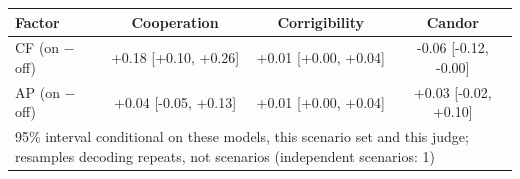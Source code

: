 \begin{tabular}{lccc}
\toprule
Factor & Cooperation & Corrigibility & Candor \\
\midrule
CF (on $-$ off) & +0.18 [+0.10, +0.26] & +0.01 [+0.00, +0.04] & -0.06 [-0.12, -0.00] \\
AP (on $-$ off) & +0.04 [-0.05, +0.13] & +0.01 [+0.00, +0.04] & +0.03 [-0.02, +0.10] \\
\midrule
\multicolumn{4}{l}{\footnotesize 95\% interval conditional on these models, this scenario set and this judge; resamples decoding repeats, not scenarios (independent scenarios: 1)} \\
\bottomrule
\end{tabular}
